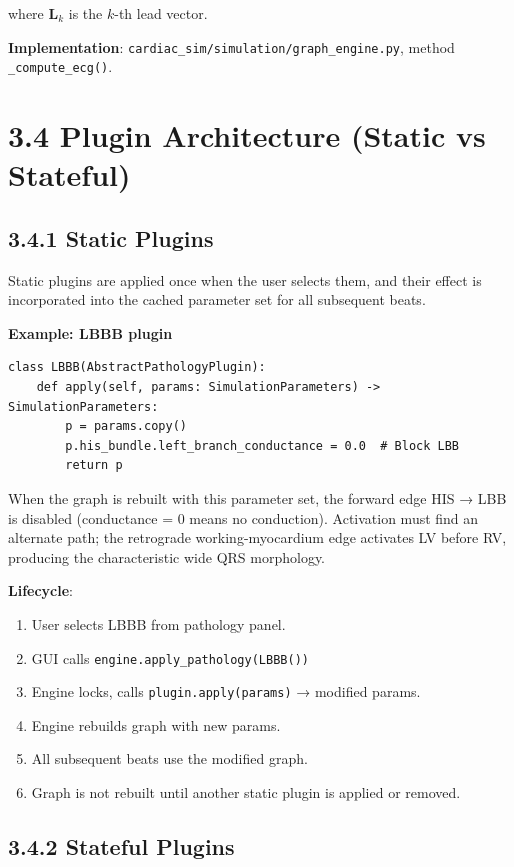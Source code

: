 \documentclass[12pt,oneside,a4paper]{book}
\newcommand{\code}[1]{\texttt{#1}}
\begin{document}
where $\mathbf{L}_k$ is the $k$-th lead vector.

\textbf{Implementation}: \code{cardiac\_sim/simulation/graph\_engine.py}, method \code{\_compute\_ecg()}.

\section{3.4 Plugin Architecture (Static vs Stateful)}

\subsection{3.4.1 Static Plugins}

Static plugins are applied once when the user selects them, and their effect is incorporated into the cached parameter set for all subsequent beats.

\textbf{Example: LBBB plugin}

\begin{lstlisting}
class LBBB(AbstractPathologyPlugin):
    def apply(self, params: SimulationParameters) -> SimulationParameters:
        p = params.copy()
        p.his_bundle.left_branch_conductance = 0.0  # Block LBB
        return p
\end{lstlisting}

When the graph is rebuilt with this parameter set, the forward edge HIS → LBB is disabled (conductance = 0 means no conduction). Activation must find an alternate path; the retrograde working-myocardium edge activates LV before RV, producing the characteristic wide QRS morphology.

\textbf{Lifecycle}:

\begin{enumerate}
  \item User selects LBBB from pathology panel.
  \item GUI calls \code{engine.apply\_pathology(LBBB())}
  \item Engine locks, calls \code{plugin.apply(params)} → modified params.
  \item Engine rebuilds graph with new params.
  \item All subsequent beats use the modified graph.
  \item Graph is not rebuilt until another static plugin is applied or removed.
\end{enumerate}

\subsection{3.4.2 Stateful Plugins}
\end{document}
